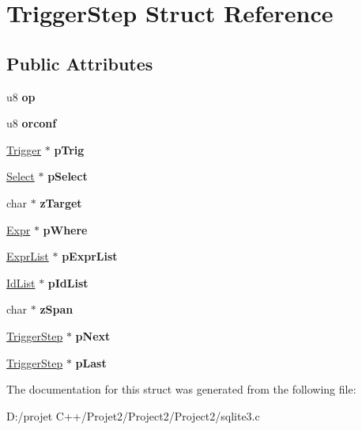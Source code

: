 \hypertarget{struct_trigger_step}{}\section{Trigger\+Step Struct Reference}
\label{struct_trigger_step}
\subsection*{Public Attributes}
\begin{DoxyCompactItemize}
\item 
\mbox{\label{struct_trigger_step_a20269855c80d869d498fcb93401832fd}} 
u8 {\bfseries op}
\item 
\mbox{\label{struct_trigger_step_a4ed8b2571fde96e84f637184453e73e3}} 
u8 {\bfseries orconf}
\item 
\mbox{\label{struct_trigger_step_a70671e85796776db06c732ab6ae4ae0d}} 
\mbox{\hyperlink{struct_trigger}{Trigger}} $\ast$ {\bfseries p\+Trig}
\item 
\mbox{\label{struct_trigger_step_a90bf3353653cedf364a7fb2eb89a19c4}} 
\mbox{\hyperlink{struct_select}{Select}} $\ast$ {\bfseries p\+Select}
\item 
\mbox{\label{struct_trigger_step_a5e48fd22b4e42ca72ae6e505861483df}} 
char $\ast$ {\bfseries z\+Target}
\item 
\mbox{\label{struct_trigger_step_ad4c293b04dfda535f3aad5b9e02726c7}} 
\mbox{\hyperlink{struct_expr}{Expr}} $\ast$ {\bfseries p\+Where}
\item 
\mbox{\label{struct_trigger_step_a607602af65ecf6c7e6cac4ea8532ac1d}} 
\mbox{\hyperlink{struct_expr_list}{Expr\+List}} $\ast$ {\bfseries p\+Expr\+List}
\item 
\mbox{\label{struct_trigger_step_a6b91bf578544104f8bd4bd5b958ddd8c}} 
\mbox{\hyperlink{struct_id_list}{Id\+List}} $\ast$ {\bfseries p\+Id\+List}
\item 
\mbox{\label{struct_trigger_step_aaba313f7968243ed0cb514c2ae5da052}} 
char $\ast$ {\bfseries z\+Span}
\item 
\mbox{\label{struct_trigger_step_a0757a0d22dbe2f7f57706014dd35759b}} 
\mbox{\hyperlink{struct_trigger_step}{Trigger\+Step}} $\ast$ {\bfseries p\+Next}
\item 
\mbox{\label{struct_trigger_step_a0aae9ea7f436881c0e9e614476a69584}} 
\mbox{\hyperlink{struct_trigger_step}{Trigger\+Step}} $\ast$ {\bfseries p\+Last}
\end{DoxyCompactItemize}


The documentation for this struct was generated from the following file\+:\begin{DoxyCompactItemize}
\item 
D\+:/projet C++/\+Projet2/\+Project2/\+Project2/sqlite3.\+c\end{DoxyCompactItemize}
